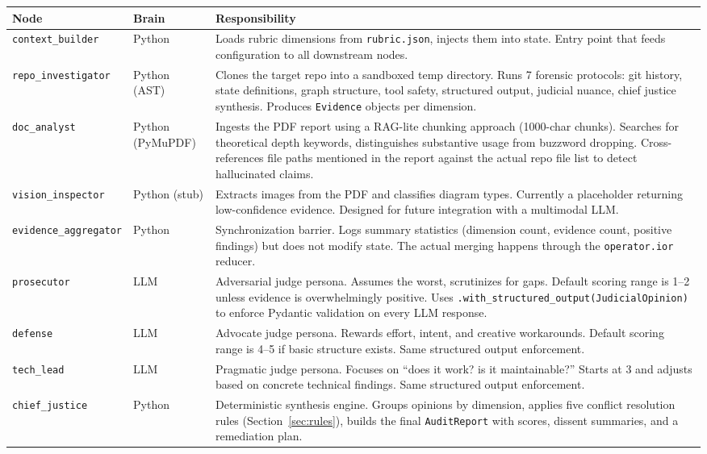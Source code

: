 \documentclass[12pt,a4paper]{article}
\begin{document}
\begin{longtable}{@{}p{3.5cm}p{2cm}p{7.5cm}@{}}
\toprule
\textbf{Node} & \textbf{Brain} & \textbf{Responsibility} \\
\midrule
\endhead
\texttt{context\_builder} & Python & Loads rubric dimensions from \texttt{rubric.json}, injects them into state. Entry point that feeds configuration to all downstream nodes. \\
\texttt{repo\_investigator} & Python (AST) & Clones the target repo into a sandboxed temp directory. Runs 7 forensic protocols: git history, state definitions, graph structure, tool safety, structured output, judicial nuance, chief justice synthesis. Produces \texttt{Evidence} objects per dimension. \\
\texttt{doc\_analyst} & Python (PyMuPDF) & Ingests the PDF report using a RAG-lite chunking approach (1000-char chunks). Searches for theoretical depth keywords, distinguishes substantive usage from buzzword dropping. Cross-references file paths mentioned in the report against the actual repo file list to detect hallucinated claims. \\
\texttt{vision\_inspector} & Python (stub) & Extracts images from the PDF and classifies diagram types. Currently a placeholder returning low-confidence evidence. Designed for future integration with a multimodal LLM. \\
\texttt{evidence\_aggregator} & Python & Synchronization barrier. Logs summary statistics (dimension count, evidence count, positive findings) but does not modify state. The actual merging happens through the \texttt{operator.ior} reducer. \\
\texttt{prosecutor} & LLM & Adversarial judge persona. Assumes the worst, scrutinizes for gaps. Default scoring range is 1--2 unless evidence is overwhelmingly positive. Uses \texttt{.with\_structured\_output(JudicialOpinion)} to enforce Pydantic validation on every LLM response. \\
\texttt{defense} & LLM & Advocate judge persona. Rewards effort, intent, and creative workarounds. Default scoring range is 4--5 if basic structure exists. Same structured output enforcement. \\
\texttt{tech\_lead} & LLM & Pragmatic judge persona. Focuses on ``does it work? is it maintainable?'' Starts at 3 and adjusts based on concrete technical findings. Same structured output enforcement. \\
\texttt{chief\_justice} & Python & Deterministic synthesis engine. Groups opinions by dimension, applies five conflict resolution rules (Section~\ref{sec:rules}), builds the final \texttt{AuditReport} with scores, dissent summaries, and a remediation plan. \\
\bottomrule
\end{longtable}
\end{document}
